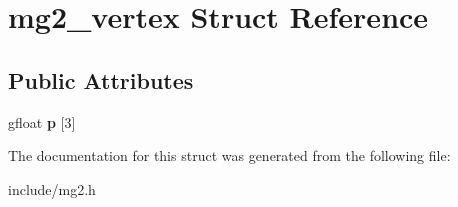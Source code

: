 \hypertarget{structmg2__vertex}{}\section{mg2\+\_\+vertex Struct Reference}
\label{structmg2__vertex}
\subsection*{Public Attributes}
\begin{DoxyCompactItemize}
\item 
\mbox{\label{structmg2__vertex_a76756f1c82bf50b7e91821429df4ffef}} 
gfloat {\bfseries p} \mbox{[}3\mbox{]}
\end{DoxyCompactItemize}


The documentation for this struct was generated from the following file\+:\begin{DoxyCompactItemize}
\item 
include/mg2.\+h\end{DoxyCompactItemize}
